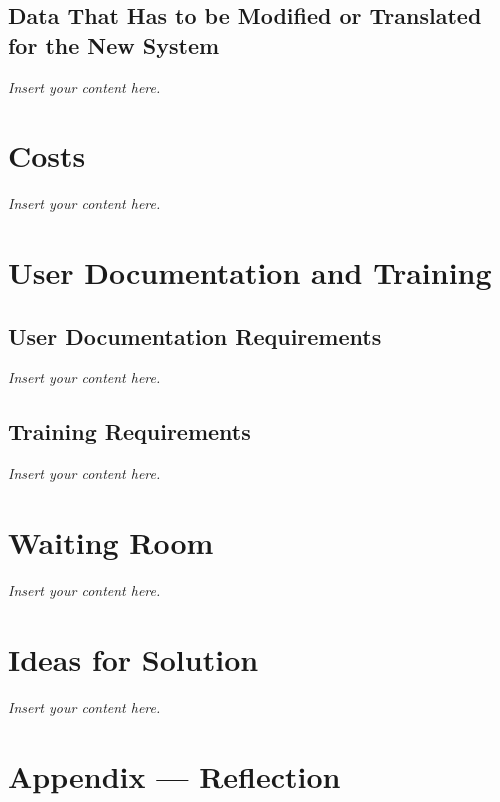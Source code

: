 \documentclass[12pt]{article}
\newcommand{\lips}{\textit{Insert your content here.}}
\begin{document}
\subsection{Data That Has to be Modified or Translated for the New System}
\lips

\section{Costs}
\lips
\section{User Documentation and Training}
\subsection{User Documentation Requirements}
\lips
\subsection{Training Requirements}
\lips

\section{Waiting Room}
\lips

\section{Ideas for Solution}
\lips

\newpage{}
\section*{Appendix --- Reflection}




\end{document}
